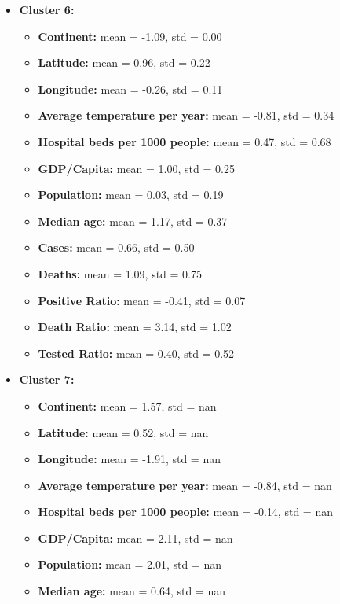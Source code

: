 \documentclass[12pt,a4paper]{article}
\begin{document}
\begin{itemize}
\begin{itemize}
        \end{itemize}
    \item \textbf{Cluster 6:} 
        \begin{itemize}
            \item \textbf{Continent:} mean = -1.09, std = 0.00
            \item \textbf{Latitude:} mean = 0.96, std = 0.22
            \item \textbf{Longitude:} mean = -0.26, std = 0.11
            \item \textbf{Average temperature per year:} mean = -0.81, std = 0.34
            \item \textbf{Hospital beds per 1000 people:} mean = 0.47, std = 0.68
            \item \textbf{GDP/Capita:} mean = 1.00, std = 0.25
            \item \textbf{Population:} mean = 0.03, std = 0.19
            \item \textbf{Median age:} mean = 1.17, std = 0.37
            \item \textbf{Cases:} mean = 0.66, std = 0.50
            \item \textbf{Deaths:} mean = 1.09, std = 0.75
            \item \textbf{Positive Ratio:} mean = -0.41, std = 0.07
            \item \textbf{Death Ratio:} mean = 3.14, std = 1.02
            \item \textbf{Tested Ratio:} mean = 0.40, std = 0.52
        \end{itemize}
    \item \textbf{Cluster 7:} 
        \begin{itemize}
            \item \textbf{Continent:} mean = 1.57, std = nan
            \item \textbf{Latitude:} mean = 0.52, std = nan
            \item \textbf{Longitude:} mean = -1.91, std = nan
            \item \textbf{Average temperature per year:} mean = -0.84, std = nan
            \item \textbf{Hospital beds per 1000 people:} mean = -0.14, std = nan
            \item \textbf{GDP/Capita:} mean = 2.11, std = nan
            \item \textbf{Population:} mean = 2.01, std = nan
            \item \textbf{Median age:} mean = 0.64, std = nan

\end{itemize}
\end{itemize}
\end{document}
